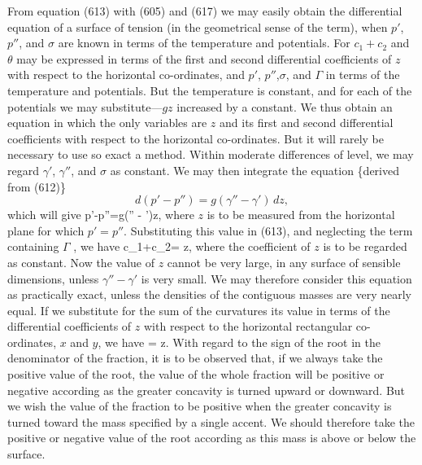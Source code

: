 \documentclass[12pt]{memoir}
\begin{document}
From equation (613) with (605) and (617) we may easily obtain the differential equation of a surface of tension (in the geometrical sense of the term), when $p'$, $p''$, and $\sigma$ are known in terms of the temperature and potentials. For $c_1+c_2$ and $\theta$ may be expressed in terms of the first and second differential coefficients of $z$ with respect to the horizontal co-ordinates, and $p'$, $p''$,$\sigma$, and $\Gamma$ in terms of the temperature and potentials. But the temperature is constant, and for each of the potentials we may substitute---$gz$ increased by a constant. We thus obtain an equation in which the only variables are $z$ and its first and second differential coefficients with respect to the horizontal co-ordinates. But it will rarely be necessary to use so exact a method. Within moderate differences of level, we may regard $\gamma'$, $\gamma''$, and $\sigma$ as constant. We may then integrate the equation \{derived from (612)\}
$$d(p' -p'') = g(\gamma'' - \gamma') \, dz,$$
which will give
\eqs p'-p''=g(\gamma'' - \gamma')z,  \label{618} \eqe
where $z$ is to be measured from the horizontal plane for which $p'=p''$. Substituting this value in (613), and neglecting the term containing  $\Gamma$ , we have
\eqs c_1+c_2=  z,  \label{619} \eqe
where the coefficient of $z$ is to be regarded as constant. Now the value of $z$ cannot be very large, in any surface of sensible dimensions, unless $\gamma'' - \gamma'$ is very small. We may therefore consider this equation as practically exact, unless the densities of the contiguous masses are very nearly equal. If we substitute for the sum of the curvatures its value in terms of the differential coefficients of $z$ with respect to the horizontal rectangular co-ordinates, $x$ and $y$, we have
\eqs
{} = z.  \label{620} \eqe
With regard to the sign of the root in the denominator of the fraction, it is to be observed that, if we always take the positive value of the root, the value of the whole fraction will be positive or negative according as the greater concavity is turned upward or downward. But we wish the value of the fraction to be positive when the greater concavity is turned toward the mass specified by a single accent. We should therefore take the positive or negative value of the root according as this mass is above or below the surface.
\end{document}
